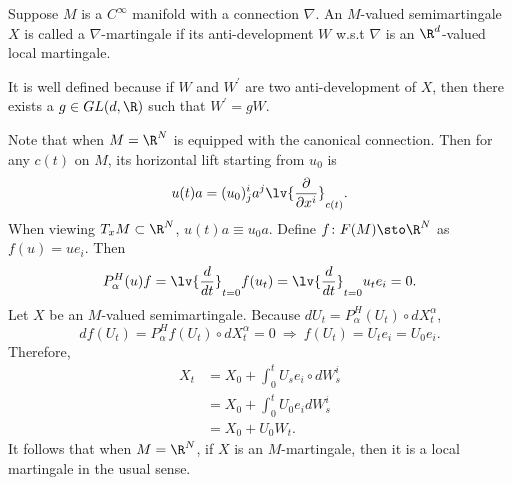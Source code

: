 \begin{defn}
    Suppose $M$ is a $C^\infty$ manifold with a connection $\nabla$. An $M$-valued semimartingale $X$ is called a $\nabla$-martingale if its anti-development $W$ w.s.t $\nabla$ is an $\R^d$-valued local martingale.
\end{defn}
\begin{rmk}
    It is well defined because if $W$ and $W^\prime$ are two anti-development of $X$, then there exists a $g \in GL(d,\R)$ such that $W^\prime = g W$.
\end{rmk}
\begin{rmk}
    Note that when $M = \R^N$ is equipped with the canonical connection. Then for any $c(t)$ on $M$, its horizontal lift starting from $u_0$ is
    \begin{equation*}
        u(t)a = (u_0)^i_j a^j \lv{\frac{\partial}{\partial x^i}}_{c(t)}.
    \end{equation*}
    When viewing $T_xM \subset \R^N$, $u(t)a \equiv u_0a$. Define $f \colon F(M) \sto \R^N$ as $f(u) = ue_i$. Then
    \begin{equation*}
        P_\alpha^H(u)f = \lv{\frac{d}{dt}}_{t = 0} f(u_t) = \lv{\frac{d}{dt}}_{t = 0} u_te_i = 0.
    \end{equation*}
    Let $X$ be an $M$-valued semimartingale. Because $dU_t = P_\alpha^H(U_t) \circ dX^\alpha_t$,
    \begin{equation*}
        df(U_t) = P_\alpha^Hf(U_t) \circ dX^\alpha_t = 0~\Rightarrow~ f(U_t) = U_te_i = U_0e_i.
    \end{equation*}
    Therefore,
    \begin{align*}
        X_t &= X_0 + \int_0^t U_se_i \circ dW^i_s \\
        &= X_0 + \int_0^t U_0e_i dW^i_s \\
        &= X_0 + U_0 W_t.
    \end{align*}
    It follows that when $M=\R^N$, if $X$ is an $M$-martingale, then it is a local martingale in the usual sense.
\end{rmk}

